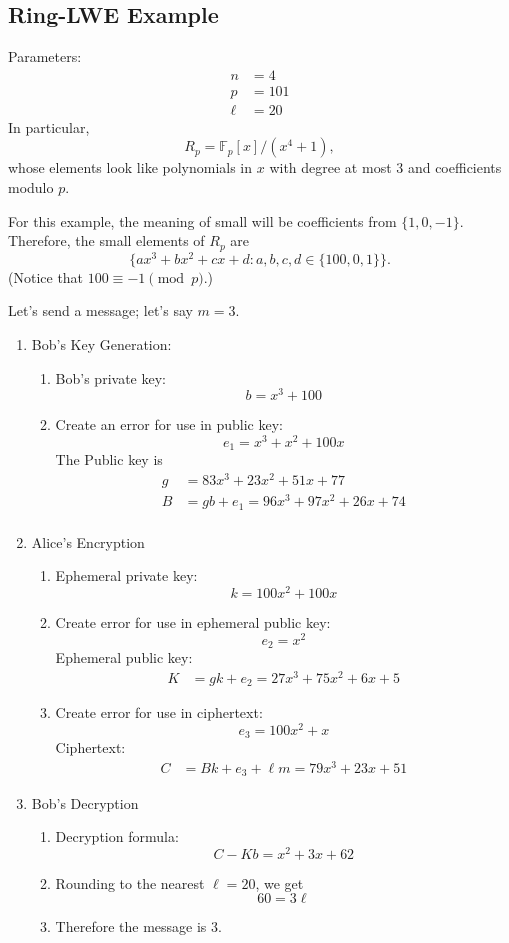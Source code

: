 \documentclass{article}
\theoremstyle{plain}
\theoremstyle{definition}
\theoremstyle{remark}
\numberwithin{theorem}{section}
\newcommand{\FF}{\mathbb{F}}
\begin{document}
\subsection{Ring-LWE Example}

Parameters:
\begin{align*}
	n &= 4 \\
	p &= 101 \\
	\ell &= 20 
\end{align*}
In particular,
\[
R_p = \FF_p[x]/(x^4+1),
\]
whose elements look like polynomials in $x$ with degree at most $3$ and coefficients modulo $p$.

For this example, the meaning of small will be coefficients from $\{1,0,-1\}$.  Therefore, the small elements of $R_p$ are
\[
\{ a x^3 + b x^2 + cx + d : a,b,c,d \in \{100,0,1\} \}.
\]
(Notice that $100 \equiv -1 \pmod p$.)

Let's send a message; let's say $m = 3$.

\begin{enumerate}
\item Bob's Key Generation:
\begin{enumerate}
\item Bob's private key:
\[
	b = x^3 + 100
\]
\item Create an error for use in public key:
\[
	e_1 = x^3 + x^2 + 100x
\]
The Public key is
\begin{align*}
	g &= 83x^3 + 23x^2 + 51x + 77 \\
	B &= gb + e_1 = 96x^3 + 97x^2 + 26x + 74 \\
\end{align*}
\end{enumerate}
\item Alice's Encryption 
\begin{enumerate}
\item Ephemeral private key:
\[
	k = 100x^2 + 100x
\]
\item Create error for use in ephemeral public key:
\[
e_2 = x^2
\]
Ephemeral public key:
\begin{align*}
	K &= gk + e_2 = 27x^3 + 75x^2 + 6x + 5 \end{align*}
\item Create error for use in ciphertext:
\[
e_3 = 100x^2 + x
\]
Ciphertext:
\begin{align*}
	  C &= Bk + e_3 + \ell m = 79x^3 + 23x + 51 \end{align*}
\end{enumerate}
\item {Bob's Decryption}
\begin{enumerate}
\item Decryption formula:
\[
	C - Kb = x^2 + 3x + 62
\]
\item Rounding to the nearest $\ell=20$, we get
\[
	60 = 3 \ell
\]
\item Therefore the message is $3$.
\end{enumerate}
\end{enumerate}
\end{document}
